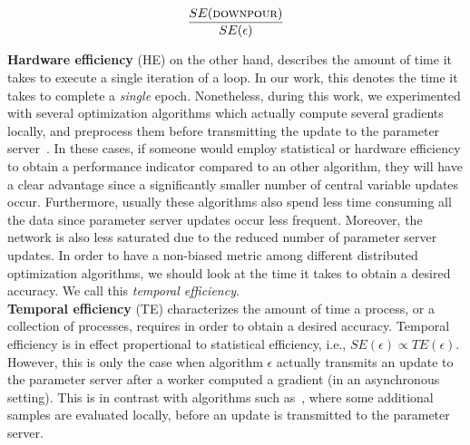\begin{equation}
  \label{eq:statistical_efficiency}
  \frac{SE(\textsc{downpour})}{SE(\epsilon)}
\end{equation}

\textbf{Hardware efficiency} (HE) on the other hand, describes the amount of time it takes to execute a single iteration of a loop. In our work, this denotes the time it takes to complete a \emph{single} epoch. Nonetheless, during this work, we experimented with several optimization algorithms which actually compute several gradients locally, and preprocess them before transmitting the update to the parameter server~\cite{zhang2015deep}. In these cases, if someone would employ statistical or hardware efficiency to obtain a performance indicator compared to an other algorithm, they will have a clear advantage since a significantly smaller number of central variable updates occur. Furthermore, usually these algorithms also spend less time consuming all the data since parameter server updates occur less frequent. Moreover, the network is also less saturated due to the reduced number of parameter server updates. In order to have a non-biased metric among different distributed optimization algorithms, we should look at the time it takes to obtain a desired accuracy. We call this \emph{temporal efficiency}.\\

\textbf{Temporal efficiency} (TE) characterizes the amount of time a process, or a collection of processes, requires in order to obtain a desired accuracy. Temporal efficiency is in effect propertional to statistical efficiency, i.e., $SE(\epsilon) \propto TE(\epsilon)$. However, this is only the case when algorithm $\epsilon$ actually transmits an update to the parameter server after a worker computed a gradient (in an asynchronous setting). This is in contrast with algorithms such as~\cite{zhang2015deep}, where some additional samples are evaluated locally, before an update is transmitted to the parameter server.

\newpage
\vspace*{\fill}

